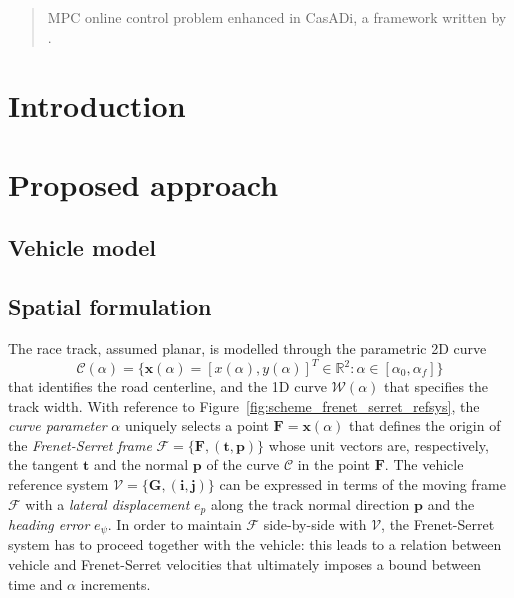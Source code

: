 \documentclass[conference]{IEEEtran} %
\renewcommand{\vec}[1]{\boldsymbol{#1}}
\begin{document}

\begin{abstract}
MPC online control problem enhanced in CasADi, a framework written by \citet{Andersson2019}.
\end{abstract}

\IEEEpeerreviewmaketitle

\section{Introduction}



\section{Proposed approach} %


\subsection{Vehicle model}


\subsection{Spatial formulation}

The race track, assumed planar, is modelled through the parametric 2D curve
\begin{equation}
\mathcal C(\alpha) = \{ \vec x (\alpha) = [x(\alpha), y(\alpha)]^T \in \mathbb{R}^2 : \alpha \in [\alpha_0, \alpha_f] \}
\end{equation}
%
that identifies the road centerline, and the 1D curve $\mathcal W(\alpha)$ that specifies the track width.
With reference to Figure~\ref{fig:scheme_frenet_serret_refsys}, the \emph{curve parameter} $\alpha$ uniquely selects a point $\vec F = \vec x(\alpha)$ that defines the origin of the \emph{Frenet-Serret frame} $\mathcal F = \{ \vec F, (\vec t, \vec p) \}$ whose unit vectors are, respectively, the tangent $\vec t$ and the normal $\vec p$ of the curve $\mathcal C$ in the point $\vec F$.
%
The vehicle reference system $\mathcal V = \{ \vec G, (\vec i, \vec j) \}$ can be expressed in terms of the moving frame $\mathcal F$ with a \emph{lateral displacement} $e_p$ along the track normal direction $\vec p$ and the \emph{heading error} $e_\psi$.
In order to maintain $\mathcal F$ side-by-side with $\mathcal V$, the Frenet-Serret system has to proceed together with the vehicle: this leads to a relation between vehicle and Frenet-Serret velocities that ultimately imposes a bound between time and $\alpha$ increments.
\end{document}
